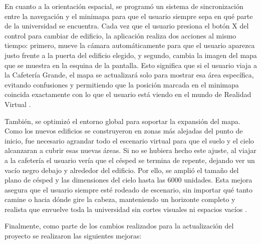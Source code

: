 \documentclass[conference]{IEEEtran}
\begin{document}
\vspace{0.2cm}

En cuanto a la orientación espacial, se programó un sistema de sincronización entre la navegación y el minimapa para que el usuario siempre sepa en qué parte de la universidad se encuentra. Cada vez que el usuario presiona el botón X del control para cambiar de edificio, la aplicación realiza dos acciones al mismo tiempo: primero, mueve la cámara automáticamente para que el usuario aparezca justo frente a la puerta del edificio elegido, y segundo, cambia la imagen del mapa que se muestra en la esquina de la pantalla. Esto significa que si el usuario viaja a la Cafetería Grande, el mapa se actualizará solo para mostrar esa área específica, evitando confusiones y permitiendo que la posición marcada en el minimapa coincida exactamente con lo que el usuario está viendo en el mundo de Realidad Virtual \cite{Silva2012}.

\vspace{0.2cm}

También, se optimizó el entorno global para soportar la expansión del mapa. Como los nuevos edificios se construyeron en zonas más alejadas del punto de inicio, fue necesario agrandar todo el escenario virtual para que el suelo y el cielo alcanzaran a cubrir esas nuevas áreas. Si no se hubiera hecho este ajuste, al viajar a la cafetería el usuario vería que el césped se termina de repente, dejando ver un vacío negro debajo y alrededor del edificio. Por ello, se amplió el tamaño del plano de césped y las dimensiones del cielo hasta las 6000 unidades. Esta mejora asegura que el usuario siempre esté rodeado de escenario, sin importar qué tanto camine o hacia dónde gire la cabeza, manteniendo un horizonte completo y realista que envuelve toda la universidad sin cortes visuales ni espacios vacíos \cite{Ginsburg2014}.

\vspace{0.2cm}

Finalmente, como parte de los cambios realizados para la actualización del proyecto se realizaron las siguientes mejoras: 

\vspace{0.1cm}
\end{document}

